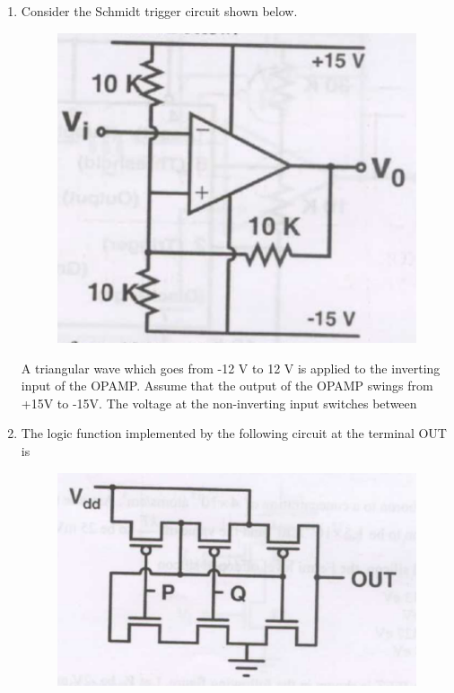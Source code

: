 \documentclass[a4paper, 11pt]{article}
\begin{document}
\begin{enumerate}
    \hfill{}

    \item Consider the Schmidt trigger circuit shown below.
    \begin{figure}[H]
        \centering
        \includegraphics[width=0.4\columnwidth]{q53}
        \caption*{}
        \label{fig:q53}
    \end{figure}
    A triangular wave which goes from -12 V to 12 V is applied to the inverting input of the OPAMP. Assume that the output of the OPAMP swings from +15V to -15V. The voltage at the non-inverting input switches between
    \begin{enumerate}
    \end{enumerate}
    
    \hfill{}
    
    \item The logic function implemented by the following circuit at the terminal OUT is
    \begin{figure}[H]
        \centering
        \includegraphics[width=0.4\columnwidth]{q54}
        \caption*{}
        \label{fig:q54}
    \end{figure}
    \begin{enumerate}
    \end{enumerate}


\end{enumerate}
\end{document}
